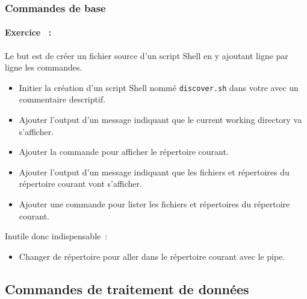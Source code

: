 \documentclass{beamer}
\begin{document}
    \begin{frame}
        \transdissolve
        \frametitle{Commandes de base}
        \framesubtitle{Exercice \execcounterdispinc{}~:}
        Le but est de créer un fichier source d'un script Shell en y ajoutant ligne par ligne les commandes.
        \begin{itemize}
            \item Initier la création d'un script Shell nommé \lstinline{discover.sh} dans votre  avec un commentaire descriptif.
            \item Ajouter l'output d'un message indiquant que le current working directory va s'afficher.
            \item Ajouter la commande pour afficher le répertoire courant.
            \item Ajouter l'output d'un message indiquant que les fichiers et répertoires du répertoire courant vont s'afficher.
            \item Ajouter une commande pour lister les fichiers et répertoires du répertoire courant.
        \end{itemize}

        Inutile donc indispensable~:
        \begin{itemize}
            \item Changer de répertoire pour aller dans le répertoire courant avec le pipe.
        \end{itemize}
    \end{frame}

    \subsection{Commandes de traitement de données}\label{subsec:commandes-donnees}
\end{document}
